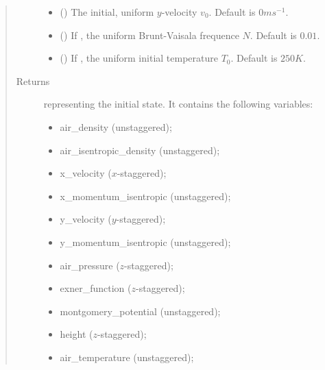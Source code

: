 \documentclass[letterpaper,10pt,english]{sphinxmanual}
\begin{document}
\begin{fulllineitems}
\begin{fulllineitems}
\begin{quote}
\begin{description}
\begin{itemize}
\item {} 
 () \textendash{} The initial, uniform \(y\)-velocity \(v_0\). Default is \(0 m s^{-1}\).

\item {} 
 () \textendash{} If , the uniform Brunt-Vaisala frequence \(N\). Default is \(0.01\).

\item {} 
 () \textendash{} If , the uniform initial temperature \(T_0\). Default is \(250 K\).

\end{itemize}

\item[{Returns}] \leavevmode

{\hyperref[\detokenize{api:storages.state_isentropic.StateIsentropic}]{}} representing the initial state.
It contains the following variables:
\begin{itemize}
\item {} 
air\_density (unstaggered);

\item {} 
air\_isentropic\_density (unstaggered);

\item {} 
x\_velocity (\(x\)-staggered);

\item {} 
x\_momentum\_isentropic (unstaggered);

\item {} 
y\_velocity (\(y\)-staggered);

\item {} 
y\_momentum\_isentropic (unstaggered);

\item {} 
air\_pressure (\(z\)-staggered);

\item {} 
exner\_function (\(z\)-staggered);

\item {} 
montgomery\_potential (unstaggered);

\item {} 
height (\(z\)-staggered);

\item {} 
air\_temperature (unstaggered);


\end{itemize}
\end{description}
\end{quote}
\end{fulllineitems}
\end{fulllineitems}
\end{document}
